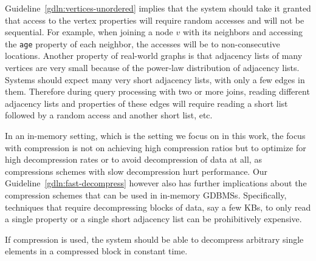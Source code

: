 \begin{guideline}
\label{gdln:fast-decompress}
Guideline~\ref{gdln:vertices-unordered} implies that the system should take it granted that access to the vertex properties will require random accesses and will not be sequential. For example, when joining a node $v$ with its neighbors and accessing the \texttt{age} property of each neighbor, the accesses will be to non-consecutive locations. Another property of real-world graphs is that adjacency lists of many vertices are very small because of the power-law distribution of adjacency lists. Systems should expect many very short adjacency lists, with only a few edges in them. Therefore during query processing with two or more joins, reading different adjacency lists and properties of these edges will require reading a short list followed by a random access and another short list, etc.

In an in-memory setting, which is the setting we focus on in this work, the focus with compression is not on achieving high compression ratios but to optimize for high decompression rates or to avoid decompression of data at all, as compressions schemes with slow decompression hurt performance. Our Guideline~\ref{gdln:fast-decompress} however also has further implications about the compression schemes that can be used in in-memory GDBMSs. Specifically, techniques that require decompressing blocks of data, say a few KBs, to only read a single property or a single short adjacency list can be prohibitively expensive.
\begin{desideratum}
\label{des:compression}
If compression is used, the system should be able to decompress arbitrary single elements in a compressed block in constant time.
\end{desideratum}  

\end{guideline}

